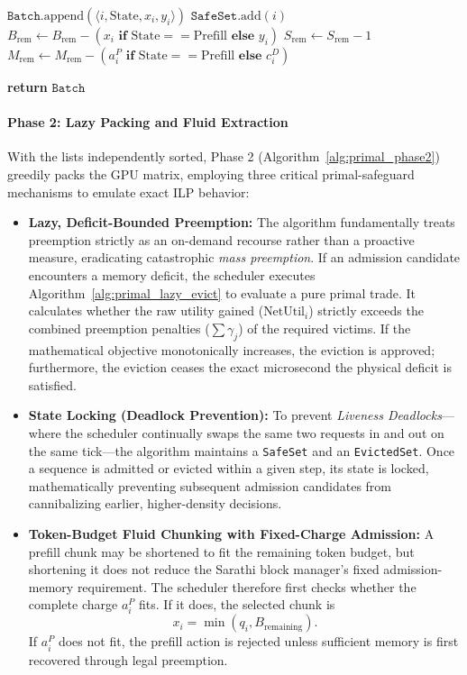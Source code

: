 \documentclass[11pt]{article}
\begin{document}
\begin{algorithm}[htpb]
\begin{algorithmic}[1]
        \State {}
            \State $\texttt{Batch}.\text{append}(\langle i, \text{State}, x_i, y_i \rangle)$
            \State $\texttt{SafeSet}.\text{add}(i)$
            \State $B_{\text{rem}} \gets B_{\text{rem}} - (x_i \textbf{ if } \text{State} == \text{Prefill} \textbf{ else } y_i)$
            \State $S_{\text{rem}} \gets S_{\text{rem}} - 1$
            \State \(M_{\text{rem}} \gets M_{\text{rem}} - (a_i^P \textbf{ if } \text{State} == \text{Prefill} \textbf{ else } c_i^D)\)
        \EndIf
    \EndFor
    
    \State \textbf{return} $\texttt{Batch}$
\EndProcedure
\end{algorithmic}
\end{algorithm}


\paragraph{Phase 2: Lazy Packing and Fluid Extraction}
With the lists independently sorted, Phase 2 (Algorithm~\ref{alg:primal_phase2}) greedily packs the GPU matrix, employing three critical primal-safeguard mechanisms to emulate exact ILP behavior:

\begin{itemize}
    \item \textbf{Lazy, Deficit-Bounded Preemption:} The algorithm fundamentally treats preemption strictly as an on-demand recourse rather than a proactive measure, eradicating catastrophic \textit{mass preemption}. If an admission candidate encounters a memory deficit, the scheduler executes Algorithm~\ref{alg:primal_lazy_evict} to evaluate a pure primal trade. It calculates whether the raw utility gained ($\text{NetUtil}_i$) strictly exceeds the combined preemption penalties ($\sum \gamma_j$) of the required victims. If the mathematical objective monotonically increases, the eviction is approved; furthermore, the eviction ceases the exact microsecond the physical deficit is satisfied.
    \item \textbf{State Locking (Deadlock Prevention):} To prevent \textit{Liveness Deadlocks}---where the scheduler continually swaps the same two requests in and out on the same tick---the algorithm maintains a \texttt{SafeSet} and an \texttt{EvictedSet}. Once a sequence is admitted or evicted within a given step, its state is locked, mathematically preventing subsequent admission candidates from cannibalizing earlier, higher-density decisions.
    \item \textbf{Token-Budget Fluid Chunking with Fixed-Charge Admission:}
    A prefill chunk may be shortened to fit the remaining token budget, but shortening it does not reduce the Sarathi block manager's fixed admission-memory requirement. The scheduler therefore first checks whether the complete charge \(a_i^P\) fits. If it does, the selected chunk is
    \[
    x_i
    =
    \min
    \left(
        q_i,
        B_{\mathrm{remaining}}
    \right).
    \]
    If \(a_i^P\) does not fit, the prefill action is rejected unless sufficient memory is first recovered through legal preemption.
\end{itemize}
\end{document}
